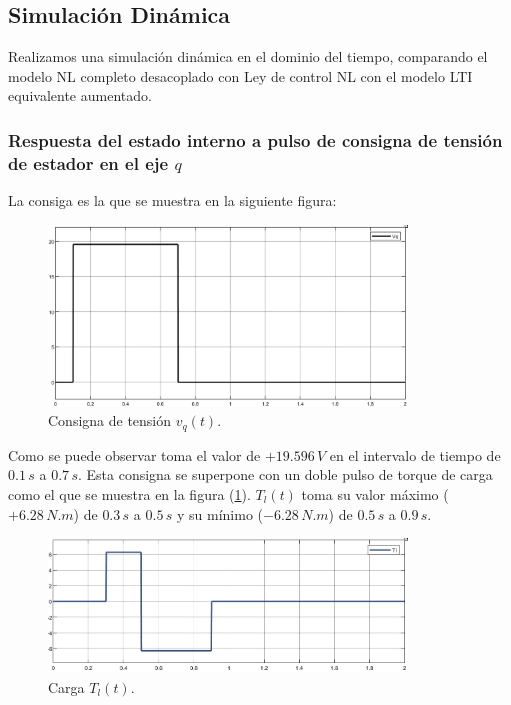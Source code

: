 \documentclass{article}
\begin{document}

\subsection{Simulación Dinámica}

Realizamos una simulación dinámica en el dominio del tiempo, comparando el modelo NL completo 
desacoplado con Ley de control NL con el modelo LTI equivalente aumentado.

\subsubsection{Respuesta del estado interno a pulso de consigna de tensión de estador en el eje $q$}

La consiga es la que se muestra en la siguiente figura:

\begin{figure}[H]
    \centering
    \includegraphics[width=0.85\textwidth]{5.1.6_consigna.jpg}
    \caption{Consigna de tensión $v_q(t)$.}
\end{figure}

Como se puede observar toma el valor de $+19.596 \, V$ en el intervalo de tiempo de $0.1 \, s$ a $0.7 \, s$.
Esta consigna se superpone con un doble pulso de torque de carga como el que se muestra en la figura (\ref{fig:torque_carga}).
$T_l(t)$ toma su  valor máximo ($+6.28 \, N.m$) de $0.3 \, s$ a $0.5 \, s$ y su mínimo ($-6.28 \, N.m$) de $0.5 \, s$ a $0.9 \, s$.

\begin{figure}[H]
    \centering
    \includegraphics[width=0.85\textwidth]{5.1.6_carga2.jpg}
    \caption{Carga $T_l(t)$.}
    \label{fig:torque_carga}
\end{figure}
\end{document}
